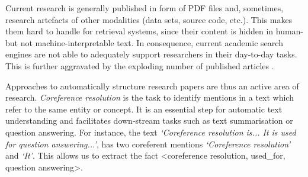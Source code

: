 \documentclass[runningheads]{llncs}
\begin{document}
\begin{comment}
Current academic search engines are not able to assist researchers adequately since most research papers are plain PDF files and not machine-interpretable.
The exploding number of published articles aggravates this situation further~\cite{bornmann15growth}.
Thus, approaches to automatically structure research papers are highly desired.

The task of \emph{coreference resolution} is to identify mentions in a text which refer to the same entity or concept. 
This is essential for a deep text understanding in order to enable, for example, text summarisation or question answering for information retrieval tasks.
For instance, the text \textit{`Coreference resolution is... It is used for question answering...'}, has two coreferent mentions \textit{`Coreference resolution'} and \textit{`It'}. This allows us to extract the fact \textsc{\textless coreference resolution, used\_for, question answering\textgreater}.
\end{comment}

Current research is generally published in form of PDF files and, sometimes, research artefacts of other modalities (data sets, source code, etc.). This makes them hard to handle for retrieval systems, since their content is hidden in human- but not machine-interpretable text. In consequence, current academic search engines are not able to adequately support researchers in their day-to-day tasks. This is further aggravated by the exploding number of published articles \cite{bornmann15growth}. 

Approaches to automatically structure research papers are thus an active area of research. \emph{Coreference resolution} is the task to identify mentions in a text which refer to the same entity or concept. It is an essential step for automatic text understanding and facilitates down-stream tasks such as text summarisation or question answering. For instance, the text \textit{`Coreference resolution is... It is used for question answering...'}, has two coreferent mentions \textit{`Coreference resolution'} and \textit{`It'}. This allows us to extract the fact \textless coreference resolution, used\_for, question answering\textgreater.
\end{document}
